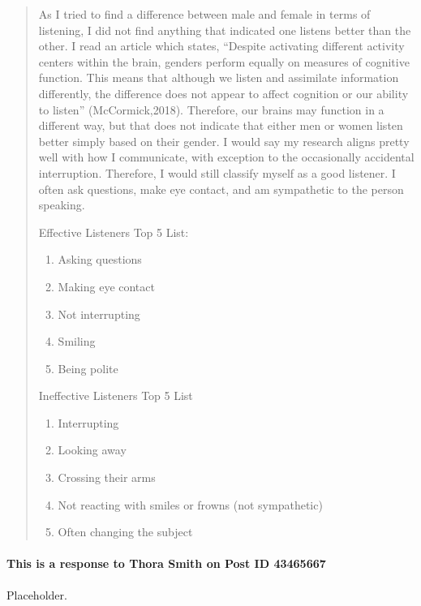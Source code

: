 \begin{quotation}
      As I tried to find a difference between male and female in terms of
        listening, I did not find anything that indicated one listens better
        than the other.  I read an article which states, “Despite activating
        different activity centers within the brain, genders perform equally on
        measures of cognitive function. This means that although we listen and
        assimilate information differently, the difference does not appear to
        affect cognition or our ability to listen” (McCormick,2018). Therefore,
        our brains may function in a different way, but that does not indicate
        that either men or women listen better simply based on their gender.
        I would say my research aligns pretty well with how I communicate, with
        exception to the occasionally accidental interruption.  Therefore, I
        would still classify myself as a good listener.  I often ask questions,
        make eye contact, and am sympathetic to the person speaking.

      Effective Listeners Top 5 List:
      \begin{enumerate}
        \item Asking questions
        \item Making eye contact
        \item Not interrupting
        \item Smiling
        \item Being polite
      \end{enumerate}

      Ineffective Listeners Top 5 List
      \begin{enumerate}
        \item Interrupting
        \item Looking away
        \item Crossing their arms
        \item Not reacting with smiles or frowns (not sympathetic)
        \item Often changing the subject
      \end{enumerate}
    \end{quotation}

    \paragraph{This is a response to Thora Smith on Post ID 43465667}
      Placeholder.
